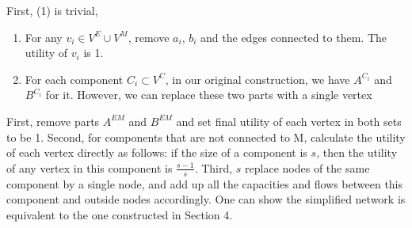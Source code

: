 \documentclass[10pt,a4paper]{article}
\begin{document}
First, (1) is trivial,  

\begin{enumerate}
	\item For any $v_i\in V^E\cup V^M$, remove $a_i$, $b_i$ and the edges connected to them. The utility of $v_i$ is 1.
	\item For each component $C_i\subset V^C$, in our original construction, we have $A^{C_i}$ and $B^{C_i}$ for it. However, we can replace these two parts with a single vertex
\end{enumerate}
First, remove parts $A^{EM}$ and $B^{EM}$ and set final utility of each vertex
in both sets to be 1. Second, for components that are not connected to
M, calculate the utility of each vertex directly as follows: if the size of a
component is $s$, then the utility of any vertex in this component is $\frac{s-1}{s}$. Third, $s$
replace nodes of the same component by a single node, and add up all the capacities and flows between this component and outside nodes accordingly. One can show the simplified network is equivalent to the one constructed in Section 4.
\end{document}
